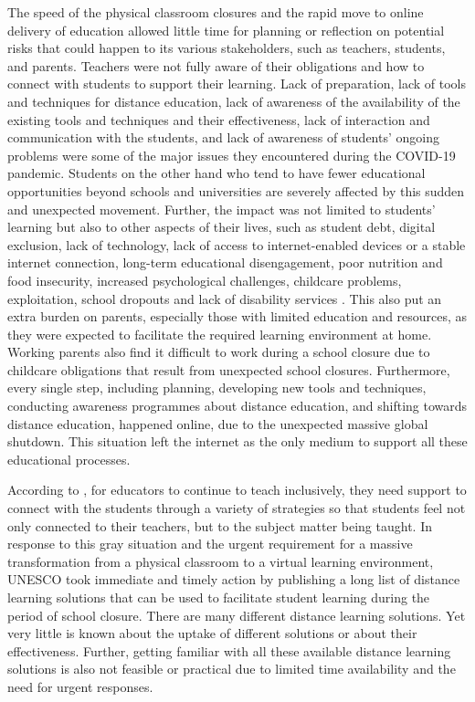 \documentclass[11pt,a4paper,]{article}
\begin{document}
The speed of the physical classroom closures and the rapid move to online delivery of education allowed little time for planning or reflection on potential risks that could happen to its various stakeholders, such as teachers, students, and parents. Teachers were not fully aware of their obligations and how to connect with students to support their learning. Lack of preparation, lack of tools and techniques for distance education, lack of awareness of the availability of the existing tools and techniques and their effectiveness, lack of interaction and communication with the students, and lack of awareness of students' ongoing problems were some of the major issues they encountered during the COVID-19 pandemic. Students on the other hand who tend to have fewer educational opportunities beyond schools and universities are severely affected by this sudden and unexpected movement. Further, the impact was not limited to students' learning but also to other aspects of their lives, such as student debt, digital exclusion, lack of technology, lack of access to internet-enabled devices or a stable internet connection, long-term educational disengagement, poor nutrition and food insecurity, increased psychological challenges, childcare problems, exploitation, school dropouts and lack of disability services \autocite{drane2020impact,daniel2020education,unescoadverse2020,richmond2020critical,carter2021teacher}. This also put an extra burden on parents, especially those with limited education and resources, as they were expected to facilitate the required learning environment at home. Working parents also find it difficult to work during a school closure due to childcare obligations that result from unexpected school closures. Furthermore, every single step, including planning, developing new tools and techniques, conducting awareness programmes about distance education, and shifting towards distance education, happened online, due to the unexpected massive global shutdown. This situation left the internet as the only medium to support all these educational processes.

According to \textcite{carter2021teacher}, for educators to continue to teach inclusively, they need support to connect with the students through a variety of strategies so that students feel not only connected to their teachers, but to the subject matter being taught. In response to this gray situation and the urgent requirement for a massive transformation from a physical classroom to a virtual learning environment, UNESCO took immediate and timely action by publishing a long list of distance learning solutions that can be used to facilitate student learning during the period of school closure. There are many different distance learning solutions. Yet very little is known about the uptake of different solutions or about their effectiveness. Further, getting familiar with all these available distance learning solutions is also not feasible or practical due to limited time availability and the need for urgent responses.
\end{document}
